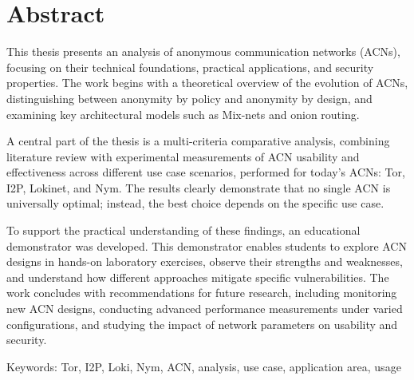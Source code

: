 \chapter*{Abstract}

This thesis presents an analysis of anonymous communication networks (ACNs), focusing on their technical foundations, practical applications, and security properties. The work begins with a theoretical overview of the evolution of ACNs, distinguishing between anonymity by policy and anonymity by design, and examining key architectural models such as Mix-nets and onion routing.


A central part of the thesis is a multi-criteria comparative analysis, combining literature review with experimental measurements of ACN usability and effectiveness across different use case scenarios, performed for today's ACNs: Tor, I2P, Lokinet, and Nym. The results clearly demonstrate that no single ACN is universally optimal; instead, the best choice depends on the specific use case.


To support the practical understanding of these findings, an educational demonstrator was developed. This demonstrator enables students to explore ACN designs in hands-on laboratory exercises, observe their strengths and weaknesses, and understand how different approaches mitigate specific vulnerabilities. The work concludes with recommendations for future research, including monitoring new ACN designs, conducting advanced performance measurements under varied configurations, and studying the impact of network parameters on usability and security.


Keywords: Tor, I2P, Loki, Nym, ACN, analysis, use case, application area, usage
